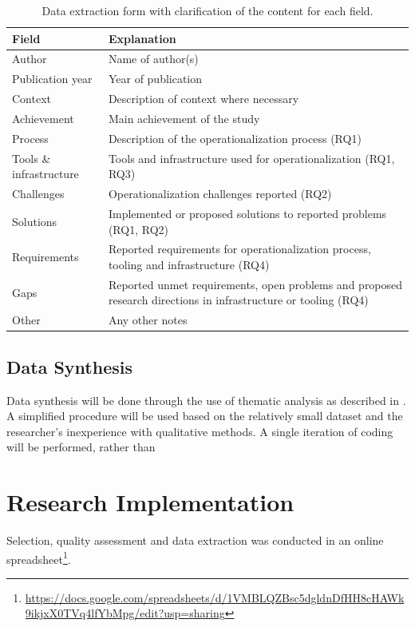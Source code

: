 \begin{table}[]
    \centering
    \begin{tabular}{l|p{8.5cm}}
        Field & Explanation\\
        \hline
        Author & Name of author(s)  \\
        Publication year & Year of publication \\
        Context & Description of context where necessary \\
        Achievement & Main achievement of the study \\
        Process & Description of the operationalization process (RQ1) \\
        Tools \& infrastructure & Tools and infrastructure used for operationalization (RQ1, RQ3) \\
        Challenges & Operationalization challenges reported (RQ2) \\
        Solutions & Implemented or proposed solutions to reported problems (RQ1, RQ2) \\
        Requirements & Reported requirements for operationalization process, tooling and infrastructure (RQ4) \\
        Gaps & Reported unmet requirements, open problems and proposed research directions in infrastructure or tooling  (RQ4) \\
        Other & Any other notes \\
    \end{tabular}
    \caption{Data extraction form with clarification of the content for each field.}
    \label{tab:data_extraction_form}
\end{table}

\subsection{Data Synthesis}
\label{sec:data_synthesis_method}
Data synthesis will be done through the use of thematic analysis as described in \cite{Lochmiller2021}.
A simplified procedure will be used based on the relatively small dataset and the researcher's inexperience with qualitative methods.
A single iteration of coding will be performed, rather than 

\section{Research Implementation}
\label{sec:research_implementation}
Selection, quality assessment and data extraction was conducted in an online spreadsheet\footnote{\url{https://docs.google.com/spreadsheets/d/1VMBLQZBsc5dgldnDfHH8cHAWk9ikjxX0TVq4lfYbMpg/edit?usp=sharing}}.


